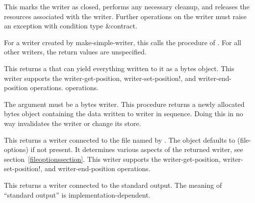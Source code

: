 \begin{entry}{%
}
   
This marks the writer as closed, performs any necessary cleanup, and
releases the resources associated with the writer. Further operations
on the writer must raise an exception with condition type
{\cf\&contract}.
   
For a writer created by {\cf make-simple-writer}, this calls the
 procedure of .  For all other writers,
the return values are unspecified.
\end{entry}

\begin{entry}{%
}
   
This returns a  that can yield everything written to it as
a bytes object. This writer supports the {\cf writer-get-position},
{\cf writer-set-position!}, and {\cf writer-end-position} operations.
operations.
\end{entry}

\begin{entry}{%
}
   
The  argument must be a bytes writer.  This procedure
returns a newly allocated bytes object containing the data written to
writer in sequence. Doing this in no way invalidates the writer or
change its store.
\end{entry}

\begin{entry}{%
}
   
This returns a writer connected to the file named by .
The  object defaults to {\cf (file-options)} if not
present. It determines various aspects of the returned writer, see
section~\ref{fileoptionssection}.  This writer supports the {\cf writer-get-position},
{\cf writer-set-position!}, and {\cf writer-end-position} operations.
\end{entry}

\begin{entry}{%
}
   
This returns a writer connected to the standard output. The meaning of
``standard output'' is implementation-dependent.
\end{entry}

